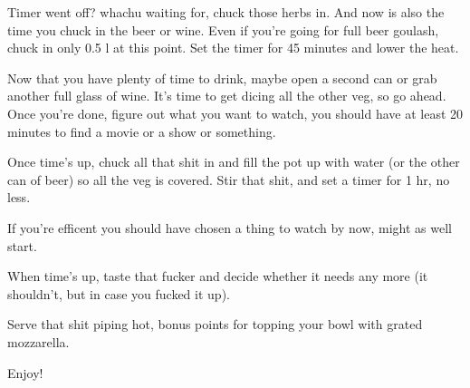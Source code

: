 \documentclass[10pt]{article}
\begin{document}
Timer went off? whachu waiting for, chuck those herbs in. And now is also the time you chuck in the beer or wine. Even if you're going for full beer goulash, chuck in only 0.5 l at this point. Set the timer for 45 minutes and lower the heat.\par
Now that you have plenty of time to drink, maybe open a second can or grab another full glass of wine. It's time to get dicing all the other veg, so go ahead. Once you're done, figure out what you want to watch, you should have at least 20 minutes to find a movie or a show or something.\par
Once time's up, chuck all that shit in and fill the pot up with water (or the other can of beer) so all the veg is covered. Stir that shit, and set a timer for 1 hr, no less.\par
If you're efficent you should have chosen a thing to watch by now, might as well start.\par
When time's up, taste that fucker and decide whether it needs any more (it shouldn't, but in case you fucked it up).\par
Serve that shit piping hot, bonus points for topping your bowl with grated mozzarella.\par
\par
Enjoy!



\label{ssub:procedure}
\end{document}
